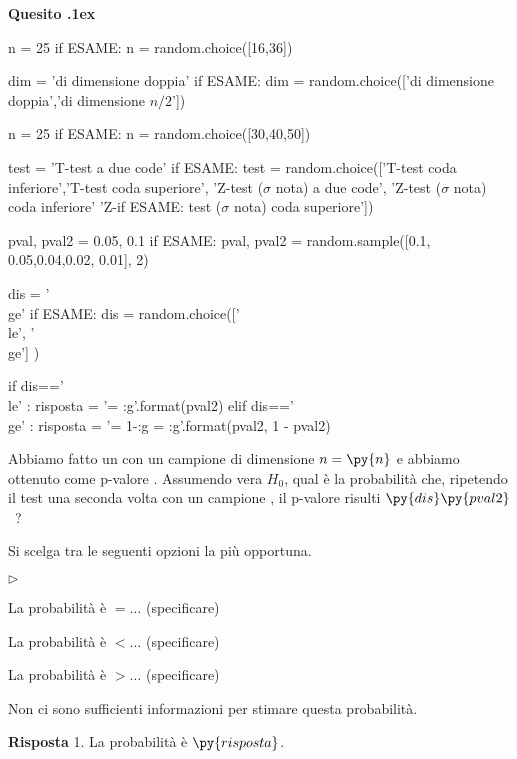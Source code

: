\documentclass[11pt,twoside,a4paper]{article}
\newcommand{\mylabel}[1]{#1\hfill}
\renewenvironment{itemize}
  {\begin{list}{$\triangleright$}{%
   \setlength{\parskip}{0mm}
   \setlength{\topsep}{.4\baselineskip}
   \setlength{\rightmargin}{0mm}
   \setlength{\listparindent}{0mm}
   \setlength{\itemindent}{0mm}
   \setlength{\labelwidth}{2ex}
   \setlength{\itemsep}{.4\baselineskip}
   \setlength{\parsep}{0mm}
   \setlength{\partopsep}{0mm}
   \setlength{\labelsep}{1ex}
   \setlength{\leftmargin}{\labelwidth+\labelsep}
   \let\makelabel\mylabel}}{%
   \end{list}\vspace*{-1.3mm}}
\newcounter{quesito}
\newenvironment{question}{\bigskip\addtocounter{quesito}{1}\par\textbf{Quesito \thequesito.\kern1ex}}{\vspace{\parskip}}
\newenvironment{answer}{\par\textbf{Risposta\quad}}{\vspace{\parskip}}
\begin{document}
\begin{question} %
\begin{pycode}
n = 25
if ESAME: n = random.choice([16,36])

dim = 'di dimensione doppia'
if ESAME: dim  = random.choice(['di dimensione doppia','di dimensione $n/2$'])

n = 25
if ESAME: n = random.choice([30,40,50])

test = 'T-test a due code'
if ESAME: test = random.choice(['T-test coda inferiore','T-test coda superiore', 'Z-test ($\sigma$ nota) a due code', 'Z-test ($\sigma$ nota) coda inferiore' 'Z-if ESAME: test ($\sigma$ nota) coda superiore'])

pval, pval2 = 0.05, 0.1
if ESAME: pval, pval2 = random.sample([0.1, 0.05,0.04,0.02, 0.01], 2)

dis = '\\ge'
if ESAME: dis = random.choice(['\\le', '\\ge'] )

if   dis=='\\le' : risposta = '= {:g}'.format(pval2)
elif dis=='\\ge' : risposta = '= 1-{:g} = {:g}'.format(pval2, 1 - pval2)
\end{pycode}
Abbiamo fatto un  con un campione di dimensione $n=\py{n}$ e abbiamo ottenuto come p-valore .
Assumendo vera $H_0$, qual è la probabilità che, ripetendo il test una seconda volta con un campione , il p-valore risulti $\py{dis}\py{pval2}$~?

Si scelga tra le seguenti opzioni la più opportuna.
\begin{itemize}
\item[1.] La probabilità è $=\dots$ (specificare)
\item[2.] La probabilità è $<\dots$ (specificare)
\item[3.] La probabilità è $>\dots$ (specificare)
\item[4.] Non ci sono sufficienti informazioni per stimare questa probabilità.
\end{itemize}
\begin{answer}
{\color{blue}1. La probabilità è $\py{risposta}$.}
\end{answer}
\end{question}
\end{document}
